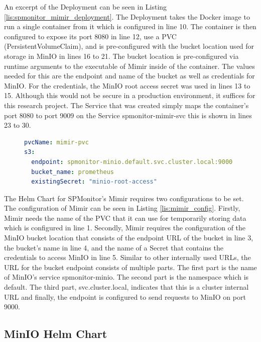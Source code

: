 An excerpt of the Deployment can be seen in Listing \ref{lis:spmonitor_mimir_deployment}.
The Deployment takes the Docker image to run a single container from it which is configured in line 10.
The container is then configured to expose its port 8080 in line 12, use a PVC (PersistentVolumeClaim),
and is pre-configured with the bucket location used for storage in MinIO in lines 16 to 21.
The bucket location is pre-configured via runtime arguments to the executable of Mimir inside
of the container. The values needed for this are the endpoint and name of the bucket as well as
credentials for MinIO. For the credentials, the MinIO root access secret was used in lines 13 to 15.
Although this would not be secure in a production environment, it suffices for this research project.
The Service that was created simply maps the container's port 8080 to port 9009 on the Service
spmonitor-mimir-svc this is shown in lines 23 to 30.

\begin{figure}[tb]
\begin{lstlisting}[caption = {SPMonitor's Mimir Helm Chart Configuration}, label = {lis:mimir_config}, style = kit-cm, language=yaml]
pvcName: mimir-pvc
s3:
  endpoint: spmonitor-minio.default.svc.cluster.local:9000
  bucket_name: prometheus
  existingSecret: "minio-root-access"
\end{lstlisting}
\end{figure}

The Helm Chart for SPMonitor's Mimir requires two configurations to be set.
The configuration of Mimir can be seen in Listing \ref{lis:mimir_config}.
Firstly, Mimir needs the name of the PVC that it can use for temporarily storing data which is configured in line 1.
Secondly, Mimir requires the configuration of the MinIO bucket location that consists
of the endpoint URL of the bucket in line 3, the bucket's name in line 4, and the name of a Secret that contains
the credentials to access MinIO in line 5.
Similar to other internally used URLs, the URL for the bucket endpoint consists of multiple parts.
The first part is the name of MinIO's service spmonitor-minio. The second part is the namespace
which is default. The third part, svc.cluster.local, indicates that this is a cluster internal URL
and finally, the endpoint is configured to send requests to MinIO on port 9000.

\subsection*{MinIO Helm Chart}

